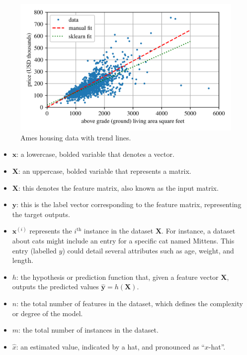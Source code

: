 \documentclass[12pt,letter]{article}
\begin{document}
\begin{figure}[H]
    \centering
	\vspace{-1ex}
    \includegraphics[]{../figures/Ames_simple_linear_regression_model_2.png}
	\vspace{-2ex}
    \caption{Ames housing data with trend lines.}
    \label{fig:GDP_data_trend}
\end{figure}






\pagebreak

\begin{mdframed}[middlelinewidth=0.5mm]
\begin{center}
\end{center}

\begin{itemize}[itemsep=0.25ex]
    \item $\textbf{x}$: a lowercase, bolded variable that denotes a vector.
    \item $\textbf{X}$: an uppercase, bolded variable that represents a matrix.
    \item $\textbf{X}$: this denotes the feature matrix, also known as the input matrix.
    \item $\textbf{y}$: this is the label vector corresponding to the feature matrix, representing the target outputs.
    \item $\textbf{x}^{(i)}$ represents the $i^\text{th}$ instance in the dataset $\textbf{X}$. For instance, a dataset about cats might include an entry for a specific cat named Mittens. This entry (labelled $y$) could detail several attributes such as age, weight, and length.
    \item $h$: the hypothesis or prediction function that, given a feature vector $\textbf{X}$, outputs the predicted values $\hat{\textbf{y}} = h(\textbf{X})$.
    \item $n$: the total number of features in the dataset, which defines the complexity or degree of the model.
    \item $m$: the total number of instances in the dataset.
    \item $\hat{x}$: an estimated value, indicated by a hat, and pronounced as ``$x$-hat''.
\end{itemize}
\end{mdframed}
\end{document}
